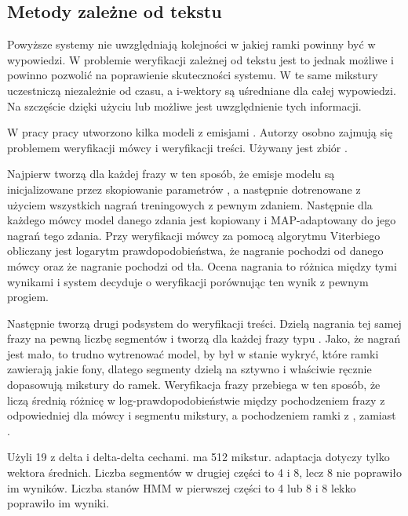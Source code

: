 
\subsection{Metody zależne od tekstu}

Powyższe systemy nie uwzględniają kolejności w jakiej ramki powinny być w wypowiedzi. W problemie weryfikacji
zależnej od tekstu jest to jednak możliwe i powinno pozwolić na poprawienie skuteczności systemu.
W  te same mikstury uczestniczą niezależnie od czasu, a i-wektory są uśredniane dla całej
wypowiedzi. Na szczęście dzięki użyciu  lub  możliwe jest uwzględnienie tych
informacji\cite{parallelSpeakerAnd}.

W pracy \cite{parallelSpeakerAnd}
pracy utworzono kilka modeli  z emisjami . Autorzy osobno
zajmują się problemem weryfikacji mówcy i weryfikacji treści. Używany jest zbiór .

Najpierw tworzą  dla każdej frazy w ten sposób, że emisje modelu są inicjalizowane przez
skopiowanie parametrów ,
a następnie dotrenowane z użyciem wszystkich nagrań treningowych z pewnym zdaniem.
Następnie dla każdego mówcy model danego zdania jest kopiowany i MAP-adaptowany do jego nagrań tego zdania.
Przy weryfikacji mówcy za pomocą algorytmu Viterbiego obliczany jest logarytm
prawdopodobieństwa, że nagranie pochodzi od danego mówcy oraz że nagranie pochodzi od  tła.
Ocena nagrania to różnica między tymi wynikami i system decyduje o weryfikacji porównując ten wynik z pewnym progiem.

Następnie tworzą drugi podsystem do weryfikacji treści. Dzielą nagrania tej samej frazy na pewną liczbę segmentów
i tworzą dla każdej frazy  typu . Jako, że nagrań jest mało, to trudno
wytrenować model, by był w stanie wykryć, które ramki zawierają jakie fony, dlatego segmenty dzielą na sztywno
i właściwie ręcznie dopasowują mikstury do ramek. Weryfikacja frazy przebiega w ten sposób, że liczą średnią
różnicę w log-prawdopodobieństwie między pochodzeniem frazy z odpowiedniej dla mówcy i segmentu mikstury, a
pochodzeniem ramki z , zamiast .

Użyli 19  z delta i delta-delta cechami.  ma 512 mikstur.  adaptacja
dotyczy tylko wektora średnich. Liczba segmentów w drugiej części to 4 i 8, lecz 8 nie poprawiło im wyników. Liczba
stanów HMM w pierwszej części to 4 lub 8 i 8 lekko poprawiło im wyniki.


